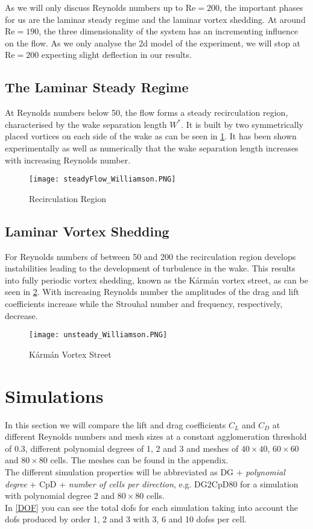 	As we will only discuss Reynolds numbers up to $\text{Re} = 200$, the important phases for us are the laminar steady regime and the laminar vortex shedding. At around $\text{Re} = 190$, the three dimensionality of the system has an incrementing influence on the flow. As we only analyse the \gls{2d} model of the experiment, we will stop at $\text{Re} = 200$ expecting slight deflection in our results.
	
	\subsection{The Laminar Steady Regime}
	
	At Reynolds numbers below 50, the flow forms a steady recirculation region, characterised by the wake separation length  $W^*$. It is built by two symmetrically placed vortices on each side of the wake as can be seen in \cref{fig:steady}. It has been shown experimentally as well as numerically that the wake separation length increases with increasing Reynolds number. 
		\begin{figure}[htp]
			\centering
			\texttt{[image: steadyFlow\_Williamson.PNG]}
			\caption{Recirculation Region \cite{williamson1996vortex}}
			\label{fig:steady}
		\end{figure}
	\subsection{Laminar Vortex Shedding}
	For Reynolds numbers of between 50 and 200 the recirculation region develops instabilities leading to the development of turbulence in the wake. This results into fully periodic vortex shedding, known as the Kármán vortex street, as can be seen in \cref{fig:unsteady}. With increasing Reynolds number the amplitudes of the drag and lift coefficients increase while the Strouhal number and frequency, respectively, decrease.
	
		\begin{figure}[htp]
			\centering
			\texttt{[image: unsteady\_Williamson.PNG]}
			\caption{Kármán Vortex Street \cite{williamson1996vortex}}
			\label{fig:unsteady}
		\end{figure}
		
\section{Simulations}
	In this section we will compare the lift and drag coefficients $C_L$ and $C_D$ at different Reynolds numbers and mesh sizes at a constant agglomeration threshold of $0.3$, different polynomial degrees of 1, 2 and 3 and meshes of $40 \times 40$, $60 \times 60$ and $80 \times 80$ cells. The meshes can be found in the appendix. \\\indent
	The different simulation properties will be abbreviated as DG $+$ \textit{polynomial degree} $+$ CpD $+$ \textit{number of cells per direction}, e.g. DG2CpD80 for a simulation with polynomial degree 2 and $80 \times 80$ cells.\\
	In \cref{DOF} you can see the total \glspl{dof} for each simulation taking into account the \glspl{dof} produced by order 1, 2 and 3 with 3, 6 and 10 \glspl{dof}s per cell.
	
